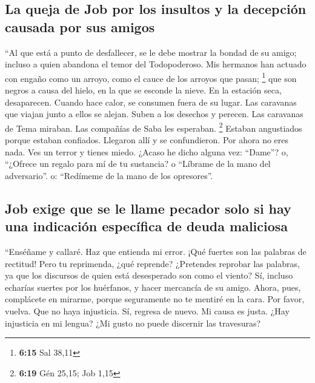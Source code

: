 \begin{paracol}{2}
\hypertarget{la-queja-de-job-por-los-insultos-y-la-decepciuxf3n-causada-por-sus-amigos}{%
\subsection{La queja de Job por los insultos y la decepción causada por
sus
amigos}\label{la-queja-de-job-por-los-insultos-y-la-decepciuxf3n-causada-por-sus-amigos}}

 ``Al que está a punto de desfallecer, se le debe mostrar
la bondad de su amigo; incluso a quien abandona el temor del
Todopoderoso.  Mis hermanos han actuado con engaño como
un arroyo, como el cauce de los arroyos que pasan; \footnote{\textbf{6:15}
  Sal 38,11}  que son negros a causa del hielo, en la que
se esconde la nieve.  En la estación seca, desaparecen.
Cuando hace calor, se consumen fuera de su lugar.  Las
caravanas que viajan junto a ellos se alejan. Suben a los desechos y
perecen.  Las caravanas de Tema miraban. Las compañías de
Saba les esperaban. \footnote{\textbf{6:19} Gén 25,15; Job 1,15}
 Estaban angustiados porque estaban confiados. Llegaron
allí y se confundieron.  Por ahora no eres nada. Ves un
terror y tienes miedo.  ¿Acaso he dicho alguna vez:
``Dame''? o, ``¿Ofrece un regalo para mí de tu sustancia?
 o ``Líbrame de la mano del adversario''. o: ``Redímeme
de la mano de los opresores''.

\hypertarget{job-exige-que-se-le-llame-pecador-solo-si-hay-una-indicaciuxf3n-especuxedfica-de-deuda-maliciosa}{%
\subsection{Job exige que se le llame pecador solo si hay una indicación
específica de deuda
maliciosa}\label{job-exige-que-se-le-llame-pecador-solo-si-hay-una-indicaciuxf3n-especuxedfica-de-deuda-maliciosa}}

 ``Enséñame y callaré. Haz que entienda mi error.
 ¡Qué fuertes son las palabras de rectitud! Pero tu
reprimenda, ¿qué reprende?  ¿Pretendes reprobar las
palabras, ya que los discursos de quien está desesperado son como el
viento?  Sí, incluso echarías suertes por los huérfanos,
y hacer mercancía de su amigo.  Ahora, pues, complácete
en mirarme, porque seguramente no te mentiré en la cara. 
Por favor, vuelva. Que no haya injusticia. Sí, regresa de nuevo. Mi
causa es justa.  ¿Hay injusticia en mi lengua? ¿Mi gusto
no puede discernir las travesuras?


\end{paracol}

